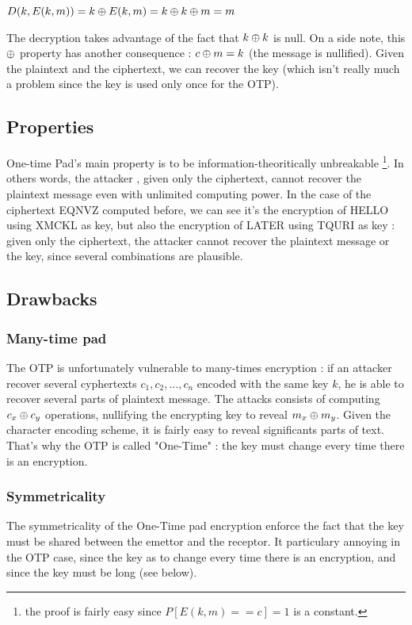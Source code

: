 \begin{mytheorem}
    $ D(k, E(k,m) ) = k \oplus E(k,m) = k \oplus k \oplus m = m $
\end{mytheorem}

The decryption takes advantage of the fact that $k \oplus k$ is null. On a side note, this $\oplus$ property has another consequence : $ c \oplus m = k $ (the message is nullified). Given the plaintext and the ciphertext, we can recover the key (which isn't really much a problem since the key is used only once for the OTP).

\subsection{Properties}

One-time Pad's main property is to be information-theoritically unbreakable \footnote{the proof is fairly easy since $P[E(k,m) == c] = 1$ is a constant.}. In others words, the attacker , given only the ciphertext, cannot recover the plaintext message even with unlimited computing power. In the case of the ciphertext EQNVZ computed before, we can see it's the encryption of HELLO using XMCKL as key, but also the encryption of LATER using TQURI as key : given only the ciphertext, the attacker cannot recover the plaintext message or the key, since several combinations are plausible.
	
\subsection{Drawbacks}

\subsubsection{Many-time pad}
The OTP is unfortunately vulnerable to many-times encryption : if an attacker recover several cyphertexts ${c_1,c_2,...,c_n}$ encoded with the same key $k$, he is able to recover several parts of plaintext message. The attacks consists of computing $c_x\oplus c_y$ operations, nullifying the encrypting key to reveal $m_x\oplus m_y$. Given the character encoding scheme, it is fairly easy to reveal significants parts of text. That's why the OTP is called "One-Time" : the key must change every time there is an encryption. 

\subsubsection{Symmetricality}
The symmetricality of the One-Time pad encryption enforce the fact that the key must be shared between the emettor and the receptor. It particulary annoying in the OTP case, since the key as to change every time there is an encryption, and since the key must be long (see below).


